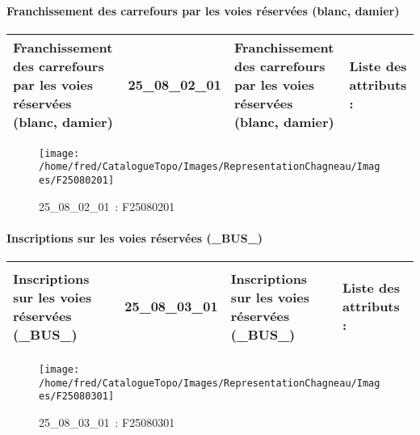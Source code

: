 \documentclass[12pt,titlepage,oneside]{book}
\begin{document}
\paragraph{Franchissement des carrefours par les voies réservées (blanc, damier)}
\noindent
\vspace{\baselineskip}

\renewcommand{\arraystretch}{1.2}
\begin{supertabular}{|p{10cm}|c|p{13cm}|p{12cm}|}
 Franchissement des carrefours par les voies réservées (blanc, damier) & 25\_08\_02\_01 & Franchissement des carrefours par les voies réservées (blanc, damier) & Liste des attributs :
\begin{enumerate}
\end{enumerate}
\\
\hline
\end{supertabular}
\begin{figure}[h!]
  \hfill         %
  \begin{minipage}[t]{3cm}
    \begin{center}
      \texttt{[image: /home/fred/CatalogueTopo/Images/RepresentationChagneau/Images/F25080201]}
      \caption[~25\_08\_02\_01]{\small{25\_08\_02\_01~:} \tiny{F25080201}}\label{F25080201}
    \end{center}
  \end{minipage}
\end{figure}


\paragraph{Inscriptions sur les voies réservées (\_BUS\_)}
\noindent
\vspace{\baselineskip}

\renewcommand{\arraystretch}{1.2}
\begin{supertabular}{|p{10cm}|c|p{13cm}|p{12cm}|}
 Inscriptions sur les voies réservées (\_BUS\_) & 25\_08\_03\_01 & Inscriptions sur les voies réservées (\_BUS\_) & Liste des attributs :
\begin{enumerate}
\end{enumerate}
\\
\hline
\end{supertabular}
\begin{figure}[h!]
  \hfill         %
  \begin{minipage}[t]{3cm}
    \begin{center}
      \texttt{[image: /home/fred/CatalogueTopo/Images/RepresentationChagneau/Images/F25080301]}
      \caption[~25\_08\_03\_01]{\small{25\_08\_03\_01~:} \tiny{F25080301}}\label{F25080301}
    \end{center}
  \end{minipage}
\end{figure}
\end{document}
